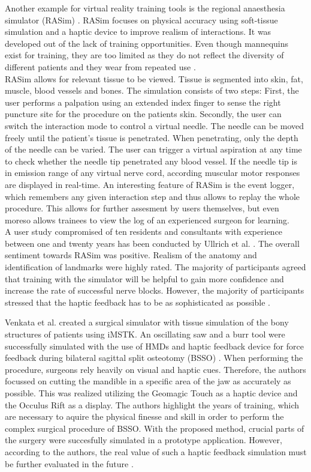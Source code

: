 Another example for virtual reality training tools is the regional anaesthesia simulator
(RASim) \cite{RN70}. RASim focuses on physical accuracy using soft-tissue simulation and a haptic device to improve realism of interactions.
It was developed out of the lack of training opportunities. Even though mannequins exist
for training, they are too limited as they do not reflect the diversity of different patients
and they wear from repeated use \cite{RN70}.
\\ RASim allows for relevant tissue to be viewed. Tissue is segmented into skin, fat,
muscle, blood vessels and bones. The simulation consists of two steps: First, the user
performs a palpation using an extended index finger to sense the right puncture site for
the procedure on the patients skin. Secondly, the user can switch the interaction mode
to control a virtual needle. The needle can be moved freely until the patient’s tissue is
penetrated. When penetrating, only the depth of the needle can be varied. The user can
trigger a virtual aspiration at any time to check whether the needle tip penetrated any
blood vessel. If the needle tip is in emission range of any virtual nerve cord, according
muscular motor responses are displayed in real-time. An interesting feature of RASim is
the event logger, which remembers any given interaction step and thus allows to replay
the whole procedure. This allows for further assesment by users themselves, but even
moreso allows trainees to view the log of an experienced surgeon for learning.
\\ A user study compromised of ten residents and consultants with experience between one
and twenty years has been conducted by Ullrich et al. \cite{RN72}. The overall sentiment towards RASim was
positive. Realism of the anatomy and identification of landmarks were highly rated. The
majority of participants agreed that training with the simulator will be helpful to gain
more confidence and increase the rate of successful nerve blocks. However, the majority
of participants stressed that the haptic feedback has to be as sophisticated as possible \cite{RN72}.

Venkata et al. created a surgical simulator with tissue simulation of the 
bony structures of patients using iMSTK.
An oscillating saw and a burr tool were successfully simulated 
with the use of HMDs and haptic feedback device for force feedback during 
bilateral sagittal split osteotomy (BSSO) \cite{VenkataS.Arikatla.2018}.
When performing the procedure, surgeons rely heavily on visual and haptic cues. 
Therefore,
the authors focussed on cutting the mandible in a specific 
area of the jaw as accurately as possible. This was realized utilizing 
the Geomagic Touch as a haptic device and the Occulus Rift as a 
display. The authors highlight the years of training, which are 
necessary to aquire the physical finesse and skill in order to 
perform the complex surgical procedure of BSSO. With the proposed 
method, crucial parts of the surgery
were succesfully simulated in a prototype application.
However, according to the authors, the real value of such a haptic feedback simulation must be
further evaluated in the future \cite{VenkataS.Arikatla.2018}.


